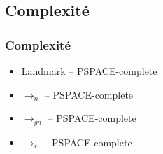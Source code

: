   \subsection{Complexité}
\begin{frame}
  \frametitle{Complexité}
  \begin{block}{}
    \begin{itemize}
      \item Landmark -- PSPACE-complete
      \item $\rightarrow_n$ -- PSPACE-complete
      \item $\rightarrow_{gn}$ -- PSPACE-complete
      \item $\rightarrow_{r}$ -- PSPACE-complete
    \end{itemize}
  \end{block}
\end{frame}

